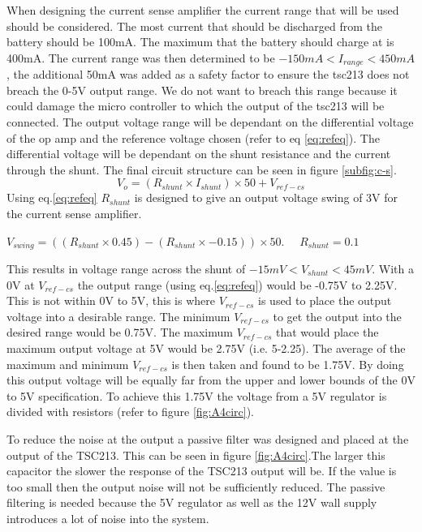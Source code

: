 When designing the current sense amplifier the current range that will be used should be considered. The most current that should be discharged from the battery should be 100mA. The maximum that the battery should charge at is 400mA. The current range was then determined to be $-150mA<I_{range}<450mA$, the additional 50mA was added as a safety factor to ensure the tsc213 does not breach the 0-5V output range. We do not want to breach this range because it could damage the micro controller to which the output of the tsc213 will be connected. The output voltage range will be dependant on the differential voltage of the op amp and the reference voltage chosen (refer to eq \ref{eq:refeq}). The differential voltage will be dependant on the shunt resistance and the current through the shunt. The final circuit structure can be seen in figure \ref{subfig:c-s}.
\begin{equation}
    V_o=(R_{shunt}\times I_{shunt})\times50+V_{ref-cs}
    \label{eq:refeq}
\end{equation}
Using eq.\ref{eq:refeq} $R_{shunt}$ is designed to give an output voltage swing of 3V for the current sense amplifier.
\begin{center}
    $V_{swing}=((R_{shunt}\times 0.45)-(R_{shunt}\times -0.15))\times 50$. \ \ $R_{shunt}=0.1$\textohm 
\end{center}

This results in voltage range across the shunt of $-15mV<V_{shunt}<45mV$. With a 0V at $V_{ref-cs}$ the output range (using eq.\ref{eq:refeq}) would be -0.75V to 2.25V. This is not within 0V to 5V, this is where $V_{ref-cs}$ is used to place the output voltage into a desirable range. The minimum $V_{ref-cs}$ to get the output into the desired range would be 0.75V. The maximum $V_{ref-cs}$ that would place the maximum output voltage at 5V would be 2.75V (i.e. 5-2.25). The average of the maximum and minimum $V_{ref-cs}$ is then taken and found to be 1.75V. By doing this output voltage will be equally far from the upper and lower bounds of the 0V to 5V specification. To achieve this 1.75V the voltage from a 5V regulator is divided with resistors (refer to figure \ref{fig:A4circ}). \newline

To reduce the noise at the output a passive filter was designed and placed at the output of the TSC213. This can be seen in figure \ref{fig:A4circ}.The larger this capacitor the slower the response of the TSC213 output will be. If the value is too small then the output noise will not be sufficiently reduced. The passive filtering is needed because the 5V regulator as well as the 12V wall supply introduces a lot of noise into the system.

